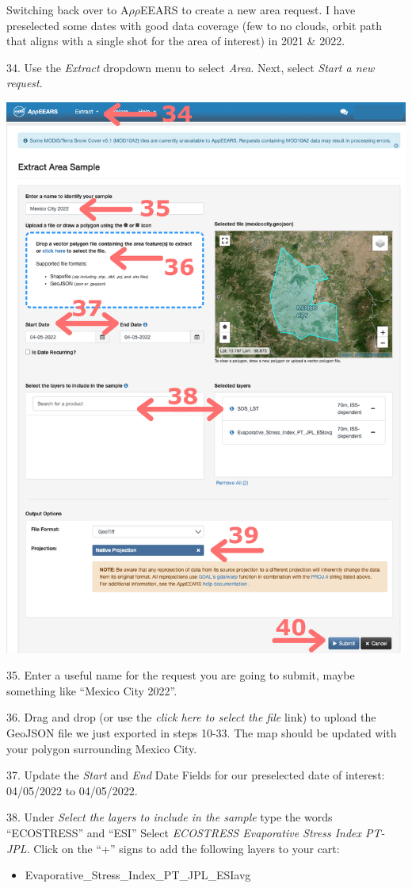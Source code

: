 \documentclass[oneside,a4paper,11pt,explicit]{book}
\begin{document}
Switching back over to A$\rho\rho$EEARS to create a new area request. I have preselected some dates with good data coverage (few to no clouds, orbit path that aligns with a single shot for the area of interest) in 2021 \& 2022. 

34. Use the \textit{Extract} dropdown menu to select \textit{Area}. Next, select \textit{ Start a new request}. 

\vspace{.5em}

\centerline{\includegraphics[width=.6\textwidth]{ESIareaRequest.png}}

\vspace{.5em}

35. Enter a useful name for the request you are going to submit, maybe something like ``Mexico City 2022''. 

36. Drag and drop (or use the \textit{click here to select the file} link) to upload the GeoJSON file we just exported in steps 10-33. The map should be updated with your polygon surrounding Mexico City.

37. Update the \textit{Start} and \textit{End} Date Fields for our preselected date of interest: 04/05/2022 to 04/05/2022.

38. Under \textit{Select the layers to include in the sample} type the words ``ECOSTRESS'' and ``ESI'' Select \textit{ECOSTRESS Evaporative Stress Index PT-JPL}. Click on the ``+'' signs to add the following layers to your cart: 

\begin{itemize}
	\item Evaporative\_Stress\_Index\_PT\_JPL\_ESIavg
\end{itemize}
\end{document}
